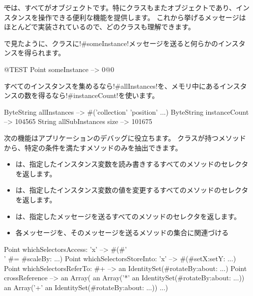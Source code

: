\documentclass[a4paper,10pt,twoside]{book}
\begin{document}
\st では、すべてがオブジェクトです。特にクラスもまたオブジェクトであり、インスタンスを操作できる便利な機能を提供します。
これから挙げるメッセージはほとんどで実装されているので、どのクラスも理解できます。

で見たように、クラスに\ct!#someInstance!メッセージを送ると何らかのインスタンスを得られます。
\begin{code}{@TEST} %
Point someInstance --> 0@0
\end{code}

すべてのインスタンスを集めるなら\ct!#allInstances!を、メモリ中にあるインスタンスの数を得るなら\ct!#instanceCount!を使います。

\begin{code}{} %
ByteString allInstances        --> #('collection' 'position'  ...)
ByteString instanceCount    --> 104565
String allSubInstances size -->  101675
\end{code}

次の機能はアプリケーションのデバッグに役立ちます。
クラスが持つメソッドから、特定の条件を満たすメソッドのみを抽出できます。

\begin{itemize}
\item {} は、指定したインスタンス変数を読み書きするすべてのメソッドのセレクタを返します。
\item {} は、指定したインスタンス変数の値を変更するすべてのメソッドのセレクタを返します。
\item {} は、指定したメッセージを送るすべてのメソッドのセレクタを返します。
\item {} 各メッセージを、そのメッセージを送るメソッドの集合に関連づける %
\end{itemize}

\begin{code}{} %
Point whichSelectorsAccess: 'x'    --> #(#'\\' #= #scaleBy: ...)
Point whichSelectorsStoreInto: 'x' --> #(#setX:setY: ...)
Point whichSelectorsReferTo: #+  --> an IdentitySet(#rotateBy:about: ...)
Point crossReference --> an Array(
		an Array('*' an IdentitySet(#rotateBy:about: ...))
		an Array('+' an IdentitySet(#rotateBy:about: ...))
		...)
\end{code}
\end{document}
